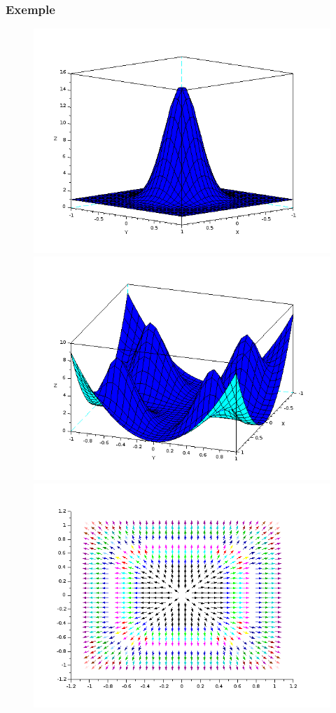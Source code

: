 \documentclass[10pt]{beamer}
\begin{document}
    \begin{frame}
    \frametitle{Exemple}
    \begin{figure}
    \begin{center}
    \includegraphics[scale=0.18]{gaussienne.png}
    \includegraphics[scale=0.18]{resmapchoisie.png} \\
                           \includegraphics[scale=0.18]{mapchoisie.png} 

\end{center}
\end{figure}
\end{frame}
\end{document}

